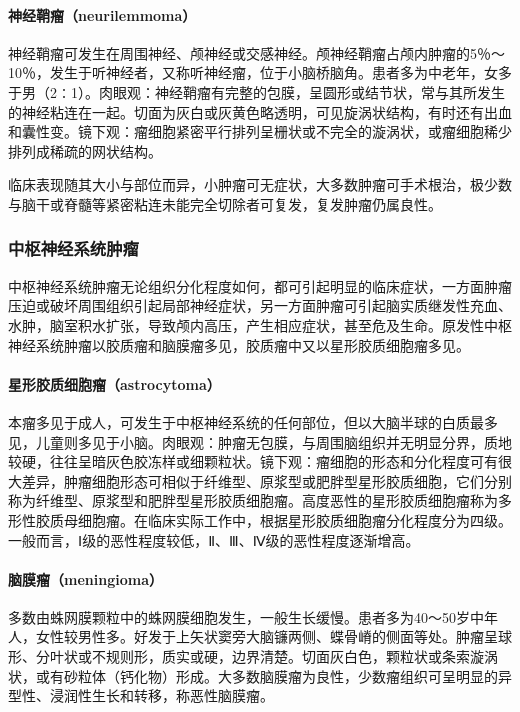 \paragraph{神经鞘瘤（neurilemmoma）}
神经鞘瘤可发生在周围神经、颅神经或交感神经。颅神经鞘瘤占颅内肿瘤的5％～10％，发生于听神经者，又称听神经瘤，位于小脑桥脑角。患者多为中老年，女多于男（2∶1）。肉眼观：神经鞘瘤有完整的包膜，呈圆形或结节状，常与其所发生的神经粘连在一起。切面为灰白或灰黄色略透明，可见旋涡状结构，有时还有出血和囊性变。镜下观：瘤细胞紧密平行排列呈栅状或不完全的漩涡状，或瘤细胞稀少排列成稀疏的网状结构。

临床表现随其大小与部位而异，小肿瘤可无症状，大多数肿瘤可手术根治，极少数与脑干或脊髓等紧密粘连未能完全切除者可复发，复发肿瘤仍属良性。

\subsubsection{中枢神经系统肿瘤}

中枢神经系统肿瘤无论组织分化程度如何，都可引起明显的临床症状，一方面肿瘤压迫或破坏周围组织引起局部神经症状，另一方面肿瘤可引起脑实质继发性充血、水肿，脑室积水扩张，导致颅内高压，产生相应症状，甚至危及生命。原发性中枢神经系统肿瘤以胶质瘤和脑膜瘤多见，胶质瘤中又以星形胶质细胞瘤多见。

\paragraph{星形胶质细胞瘤（astrocytoma）}
本瘤多见于成人，可发生于中枢神经系统的任何部位，但以大脑半球的白质最多见，儿童则多见于小脑。肉眼观：肿瘤无包膜，与周围脑组织并无明显分界，质地较硬，往往呈暗灰色胶冻样或细颗粒状。镜下观：瘤细胞的形态和分化程度可有很大差异，肿瘤细胞形态可相似于纤维型、原浆型或肥胖型星形胶质细胞，它们分别称为纤维型、原浆型和肥胖型星形胶质细胞瘤。高度恶性的星形胶质细胞瘤称为多形性胶质母细胞瘤。在临床实际工作中，根据星形胶质细胞瘤分化程度分为四级。一般而言，Ⅰ级的恶性程度较低，Ⅱ、Ⅲ、Ⅳ级的恶性程度逐渐增高。

\paragraph{脑膜瘤（meningioma）}
多数由蛛网膜颗粒中的蛛网膜细胞发生，一般生长缓慢。患者多为40～50岁中年人，女性较男性多。好发于上矢状窦旁大脑镰两侧、蝶骨嵴的侧面等处。肿瘤呈球形、分叶状或不规则形，质实或硬，边界清楚。切面灰白色，颗粒状或条索漩涡状，或有砂粒体（钙化物）形成。大多数脑膜瘤为良性，少数瘤组织可呈明显的异型性、浸润性生长和转移，称恶性脑膜瘤。

